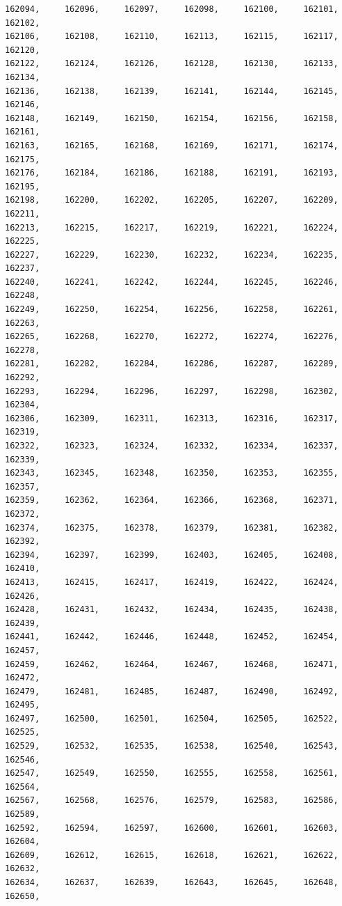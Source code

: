 \documentclass[a4paper,11pt]{report}
\begin{document}
\begin{verbatim}
162094,     162096,     162097,     162098,     162100,     162101,     162102,
162106,     162108,     162110,     162113,     162115,     162117,     162120,
162122,     162124,     162126,     162128,     162130,     162133,     162134,
162136,     162138,     162139,     162141,     162144,     162145,     162146,
162148,     162149,     162150,     162154,     162156,     162158,     162161,
162163,     162165,     162168,     162169,     162171,     162174,     162175,
162176,     162184,     162186,     162188,     162191,     162193,     162195,
162198,     162200,     162202,     162205,     162207,     162209,     162211,
162213,     162215,     162217,     162219,     162221,     162224,     162225,
162227,     162229,     162230,     162232,     162234,     162235,     162237,
162240,     162241,     162242,     162244,     162245,     162246,     162248,
162249,     162250,     162254,     162256,     162258,     162261,     162263,
162265,     162268,     162270,     162272,     162274,     162276,     162278,
162281,     162282,     162284,     162286,     162287,     162289,     162292,
162293,     162294,     162296,     162297,     162298,     162302,     162304,
162306,     162309,     162311,     162313,     162316,     162317,     162319,
162322,     162323,     162324,     162332,     162334,     162337,     162339,
162343,     162345,     162348,     162350,     162353,     162355,     162357,
162359,     162362,     162364,     162366,     162368,     162371,     162372,
162374,     162375,     162378,     162379,     162381,     162382,     162392,
162394,     162397,     162399,     162403,     162405,     162408,     162410,
162413,     162415,     162417,     162419,     162422,     162424,     162426,
162428,     162431,     162432,     162434,     162435,     162438,     162439,
162441,     162442,     162446,     162448,     162452,     162454,     162457,
162459,     162462,     162464,     162467,     162468,     162471,     162472,
162479,     162481,     162485,     162487,     162490,     162492,     162495,
162497,     162500,     162501,     162504,     162505,     162522,     162525,
162529,     162532,     162535,     162538,     162540,     162543,     162546,
162547,     162549,     162550,     162555,     162558,     162561,     162564,
162567,     162568,     162576,     162579,     162583,     162586,     162589,
162592,     162594,     162597,     162600,     162601,     162603,     162604,
162609,     162612,     162615,     162618,     162621,     162622,     162632,
162634,     162637,     162639,     162643,     162645,     162648,     162650,

\end{verbatim}
\end{document}
